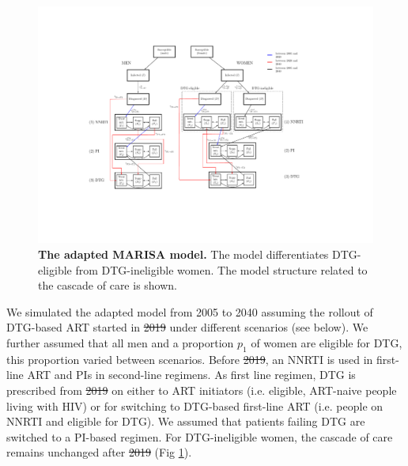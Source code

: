 \documentclass[10pt,letterpaper]{article}
\providecommand{\DIFaddtex}[1]{{\protect\color{blue}\uwave{#1}}} %
\providecommand{\DIFdeltex}[1]{{\protect\color{red}\sout{#1}}}                      %
\providecommand{\DIFaddbegin}{} %
\providecommand{\DIFaddend}{} %
\providecommand{\DIFdelbegin}{} %
\providecommand{\DIFdelend}{} %
\providecommand{\DIFaddbeginFL}{} %
\providecommand{\DIFaddendFL}{} %
\providecommand{\DIFadd}[1]{\texorpdfstring{\DIFaddtex{#1}}{#1}} %
\providecommand{\DIFdel}[1]{\texorpdfstring{\DIFdeltex{#1}}{}} %
\newcommand{\DIFscaledelfig}{0.5}
\newlength{\DIFdelgraphicswidth} %
\newlength{\DIFdelgraphicsheight} %
\newcommand{\DIFaddincludegraphics}[2][]{{\color{blue}\fbox{\DIFOincludegraphics[#1]{#2}}}} %
\newcommand{\DIFdelincludegraphics}[2][]{%
\sbox{\DIFdelgraphicsbox}{\DIFOincludegraphics[#1]{#2}}%
\settoboxwidth{\DIFdelgraphicswidth}{\DIFdelgraphicsbox} %
\settoboxtotalheight{\DIFdelgraphicsheight}{\DIFdelgraphicsbox} %
\scalebox{\DIFscaledelfig}{%
\parbox[b]{\DIFdelgraphicswidth}{\usebox{\DIFdelgraphicsbox}\\[-\baselineskip] \rule{\DIFdelgraphicswidth}{0em}}\llap{\resizebox{\DIFdelgraphicswidth}{\DIFdelgraphicsheight}{%
\setlength{\unitlength}{\DIFdelgraphicswidth}%
\begin{picture}(1,1)%
\thicklines\linethickness{2pt} %
{\color[rgb]{1,0,0}\put(0,0){\framebox(1,1){}}}%
{\color[rgb]{1,0,0}\put(0,0){\line( 1,1){1}}}%
{\color[rgb]{1,0,0}\put(0,1){\line(1,-1){1}}}%
\end{picture}%
}\hspace*{3pt}}} %
} %
\DeclareRobustCommand{\DIFaddbegin}{\DIFOaddbegin \let\includegraphics\DIFaddincludegraphics} %
\DeclareRobustCommand{\DIFaddend}{\DIFOaddend \let\includegraphics\DIFOincludegraphics} %
\DeclareRobustCommand{\DIFdelbegin}{\DIFOdelbegin \let\includegraphics\DIFdelincludegraphics} %
\DeclareRobustCommand{\DIFdelend}{\DIFOaddend \let\includegraphics\DIFOincludegraphics} %
\DeclareRobustCommand{\DIFaddbeginFL}{\DIFOaddbeginFL \let\includegraphics\DIFaddincludegraphics} %
\DeclareRobustCommand{\DIFaddendFL}{\DIFOaddendFL \let\includegraphics\DIFOincludegraphics} %
\begin{document}
\begin{figure}[h]
   \DIFaddbeginFL \includegraphics[width=14cm]{../figures/Fig1.pdf}
   \DIFaddendFL \vspace{0.5cm}
   \caption{{\bf The adapted MARISA model.}
The model differentiates DTG-eligible from DTG-ineligible women. The model structure related to the cascade of care is shown.}\label{fig1}
\end{figure}

We simulated the adapted model from 2005 to 2040 assuming the rollout of DTG-based ART started in \DIFdelbegin \DIFdel{2019 }\DIFdelend \DIFaddbegin \DIFadd{2020 }\DIFaddend under different scenarios (see below). We further assumed that all men and a proportion $p_1$ of women are eligible for DTG, this proportion varied between scenarios. Before \DIFdelbegin \DIFdel{2019}\DIFdelend \DIFaddbegin \DIFadd{2020}\DIFaddend , an NNRTI is used in first-line ART and PIs in second-line regimens. As first line regimen,  DTG is prescribed from \DIFdelbegin \DIFdel{2019 }\DIFdelend \DIFaddbegin \DIFadd{2020 }\DIFaddend on either to ART initiators (i.e. eligible, ART-naive people living with HIV) or for switching to DTG-based first-line ART (i.e. people on NNRTI and eligible for DTG). We assumed that patients failing DTG are switched to a PI-based regimen. For DTG-ineligible women, the cascade of care remains unchanged after \DIFdelbegin \DIFdel{2019 }\DIFdelend \DIFaddbegin \DIFadd{2020 }\DIFaddend (Fig \ref{fig1}).
\end{document}
